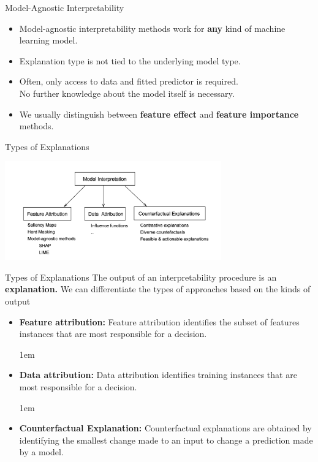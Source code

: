 \documentclass[aspectratio=169]{../latex_main/tntbeamer}  %
\begin{document}
\begin{frame}[c]{Model-Agnostic Interpretability}
	\begin{itemize}
		\itemsep2em
		\item Model-agnostic interpretability methods work for \textbf{any} kind of machine learning model.
		\item Explanation type is not tied to the underlying model type.
		\item Often, only access to data and fitted predictor is required.\\
		 No further knowledge about the model itself is necessary.
		\item We usually distinguish between \textbf{feature effect} and \textbf{feature importance} methods.
	\end{itemize}
\end{frame}


\begin{frame}[c]{Types of Explanations}
	\begin{center}
		\includegraphics[width=0.7\textwidth]{01_introduction/figure/1-attributions.png}
    \end{center}
\end{frame}



\begin{frame}[c]{Types of Explanations}
	\vspace{-2em}
	The output of an interpretability procedure is an \textbf{explanation.} We can differentiate the types of approaches based on the kinds of output

	
	\begin{itemize}

    \itemsep1em
	\item 
		\textbf{Feature attribution:} Feature attribution identifies the subset of features instances that are most responsible for a decision.
	
	\itemsep1em
	
	\pause
	\item 
		\textbf{Data attribution:} Data attribution identifies  training instances that are most responsible for a decision.
		
		\itemsep1em
		
	\pause
	\item 
	   \textbf{Counterfactual Explanation:} 
	   Counterfactual explanations are  obtained by identifying the smallest change made to an input to change a prediction made by a model.
	  
	\end{itemize}
	
\end{frame}
\end{document}
